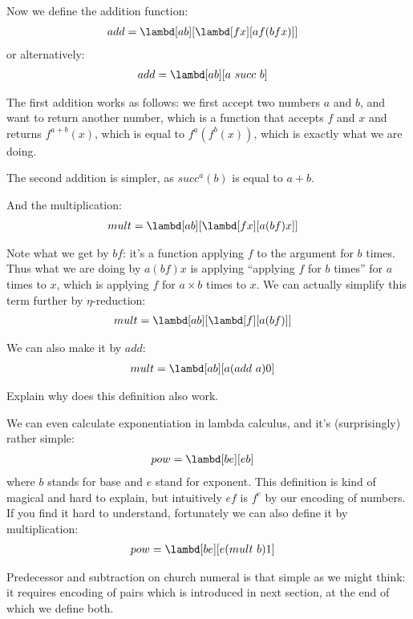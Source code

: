\documentclass[../../../include/open-logic-section]{subfiles}
\begin{document}
Now we define the addition function:
\begin{align*}
  {add} &= \lambd[{a}{b}][\lambd[fx][{a} f ({b} f x)]]
\end{align*}
or alternatively:
\begin{align*}
  {add} &= \lambd[{a}{b}][{a} ~ {succ} ~ {b}]
\end{align*}

The first addition works as follows: we first accept two numbers ${a}$ and
${b}$, and want to return another number, which is a function that accepts
$f$ and $x$ and returns $f^{a+b}(x)$, which is equal to
$f^{a}(f^{b}(x))$, which is exactly what we are doing.

The second addition is simpler, as $succ^a(b)$ is equal to ${a + b}$.

And the multiplication:
\begin{align*}
  {mult} &= \lambd[{a}{b}][\lambd[fx][{a} ({b} f) x]]
\end{align*}

Note what we get by ${b} f$: it's a function applying $f$
to the argument for $b$ times. Thus what we are doing by ${a} ({b} f) x$ is applying ``applying
$f$ for $b$ times'' for $a$ times to $x$, which is applying $f$ for $a
\times b$ times to $x$. We can actually simplify this term further by
$\eta$-reduction:
\begin{align*}
  {mult} &= \lambd[ab][\lambd[f][a (b f)]]
\end{align*}

We can also make it by $add$:
\begin{align*}
  {mult} &= \lambd[ab][a (add ~ a) 0]
\end{align*}

\begin{prob}
  Explain why does this definition also work.
\end{prob}

We can even calculate exponentiation in lambda calculus, and it's
(surprisingly) rather simple:
\begin{align*}
  {pow} &= \lambd[be][e b]
\end{align*}
where $b$ stands for base and $e$ stand for exponent. 
This definition is kind of magical and hard to explain, but
intuitively $e f$ is $f^e$ by our encoding of numbers. If you find it
hard to understand, fortunately we can
also define it by multiplication:
\begin{align*}
  {pow} &= \lambd[be][e ({mult}~ b) 1]
\end{align*}

Predecessor and subtraction on church numeral is that simple as we might think: it
requires encoding of pairs which is introduced in next section,
at the end of which we define both.
\end{document}
